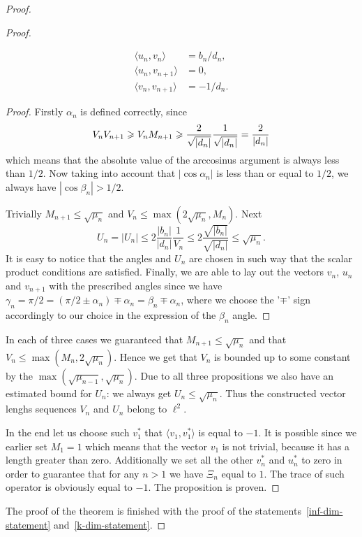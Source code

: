 \documentclass[12pt]{amsart}
\theoremstyle{case}
\begin{document}
\begin{proof}
\begin{proof}
\begin{prop}
\begin{align*}
                \langle u_n, v_n \rangle &= b_n/d_n,\\
                \langle u_n, v_{n+1} \rangle &= 0,\\
                \langle v_n, v_{n+1} \rangle &= -1/d_n.
              \end{align*}
          \end{prop}
          \begin{proof}
            Firstly $\alpha_n$ is defined correctly, since
            \[
              V_n V_{n+1} \geq V_n M_{n+1} \geq \frac{2}{\sqrt{\smash[b]{|d_n|}}} \frac{1}{\sqrt{\smash[b]{|d_n|}}} = \frac{2}{|d_n|}
            \]
              which means that the absolute value of the arccosinus argument is always less than $1/2$. Now taking into
              account that $|\cos{\alpha_n}|$ is less than or equal to $1/2$, we always have $|\cos{\beta_n}| > 1/2$.
            
            Trivially $M_{n+1} \leq \sqrt{\mu_n}$ and $V_n \leq \max(2\sqrt{\mu_n}, M_n)$.
            Next
            \[
              U_n = |U_n| \leq 2 \frac{|b_n|}{|d_n|} \frac{1}{V_n} \leq 2 \frac{\sqrt{|b_n|}}{\sqrt{|d_n|}} \leq \sqrt{\mu_n}.
            \]
            It is easy to notice that the angles and $U_n$ are chosen in such way that the scalar product conditions are 
              satisfied.
            Finally, we are able to lay out the vectors $v_n$, $u_n$ and $v_{n+1}$ with the prescribed angles 
              since we have $\gamma_n = \pi/2 = (\pi/2 \pm \alpha_n) \mp \alpha_n = \beta_n \mp \alpha_n$,
              where we choose the '$\mp$' sign accordingly to our choice in the expression of the $\beta_n$ angle.
          \end{proof}
        In each of three cases we guaranteed that $M_{n+1} \leq \sqrt{\mu_n}$ and
          that $V_n \leq \max(M_n, 2\sqrt{\mu_n})$.
        Hence we get that $V_n$ is bounded up to some constant by the $\max(\sqrt{\mu_{n-1}}, \sqrt{\mu_n})$.
        Due to all three propositions we also have an estimated bound for $U_n$: we always get
        $U_n \leq \sqrt{\mu_n}$. Thus the constructed vector lenghs sequences $V_n$ and $U_n$ belong to $\ell^2$.

        In the end let us choose such $v_1^*$ that $\langle v_1, v_1^*\rangle$ is equal to $-1$.
        It is possible since we earlier set $M_1 = 1$ which means that the vector $v_1$ is not trivial, because it has
          a length greater than zero.
        Additionally we set all the other $v^*_n$ and $u^*_n$ to zero in order to guarantee that for any $n > 1$ we have $\Xi_n$ equal to $1$.
        The trace of such operator is obviously equal to $-1$.
        The proposition is proven.
      \end{proof}
      The proof of the theorem is finished with the proof of the statements~\ref{inf-dim-statement} and~\ref{k-dim-statement}.
  \end{proof}
    
\end{document}
